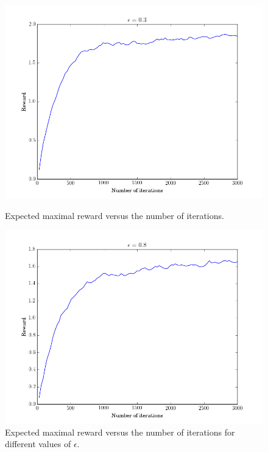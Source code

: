 \documentclass [a4paper] {report}
\begin{document}
	\begin{figure}[H]
		\begin{center}
			\includegraphics[scale=0.4]{Images/return_SARSA_eps_0_3.png}
			\caption{Expected maximal reward versus the number of iterations.}
		\end{center}
		
		\begin{center}
			\includegraphics[scale=0.4]{Images/return_SARSA_eps_0_8.png}
			
		\end{center}
		\caption{Expected maximal reward versus the number of iterations for different values of $\epsilon$.}
		\label{SARSA_reward}
	\end{figure}
\end{document}
